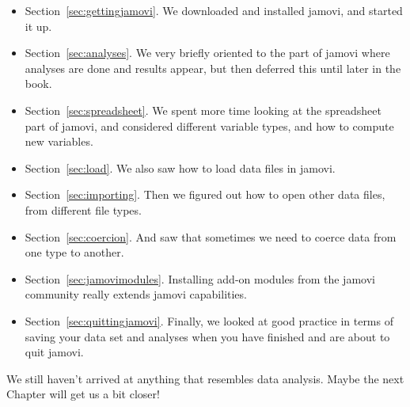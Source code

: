 \begin{itemize}
\item Section~\ref{sec:gettingjamovi}. We downloaded and installed jamovi, and started it up.
\item Section~\ref{sec:analyses}. We very briefly oriented to the part of jamovi where analyses are done and results appear, but then deferred this until later in the book.
\item Section~\ref{sec:spreadsheet}. We spent more time looking at the spreadsheet part of jamovi, and considered different variable types, and how to compute new variables.
\item Section~\ref{sec:load}. We also saw how to load data files in jamovi.
\item Section~\ref{sec:importing}. Then we figured out how to open other data files, from different file types.
\item Section~\ref{sec:coercion}. And saw that sometimes we need to coerce data from one type to another.
\item Section~\ref{sec:jamovimodules}. Installing add-on modules from the jamovi community really extends jamovi capabilities.
\item Section~\ref{sec:quittingjamovi}. Finally, we looked at good practice in terms of saving your data set and analyses when you have finished and are about to quit jamovi.
\end{itemize}

\noindent
We still haven't arrived at anything that resembles data analysis. Maybe the next Chapter will get us a bit closer!



